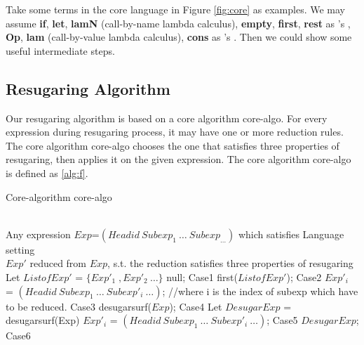 Take some terms in the core language in Figure \ref{fig:core} as examples.
We may assume {\bfseries if}, {\bfseries let}, {\bfseries lamN} (call-by-name lambda calculus), {\bfseries empty}, {\bfseries first}, {\bfseries rest} as 's , {\bfseries Op}, {\bfseries lam} (call-by-value lambda calculus), {\bfseries cons} as 's . Then we could show some useful intermediate steps.


\subsection{Resugaring Algorithm}

Our resugaring algorithm is based on a core algorithm core-algo. For every expression during resugaring process, it may have one or more reduction rules. The core algorithm core-algo chooses the one that satisfies three properties of resugaring, then applies it on the given expression. The core algorithm core-algo is defined as \ref{alg:f}.
\begin{algorithm}
	\caption{Core-algorithm core-algo}
	\label{alg:f}     %
	\begin{algorithmic}[1]       %
		\REQUIRE ~~\\      %
		Any expression $Exp$=$(Headid~Subexp_{1}~\ldots~Subexp_{\ldots})$ which satisfies Language setting
		\ENSURE ~~\\     %
		$Exp'$ reduced from $Exp$, s.t. the reduction satisfies three properties of resugaring
		\STATE     Let $ListofExp'$ = $\{Exp'_{1}\;,Exp'_{2}~\ldots\}$
		\RETURN null; \hfill Case1
		\RETURN first($ListofExp'$); \hfill Case2
		\ELSE
		\RETURN $Exp'_{i}$ = $(Headid~Subexp_{1}~\ldots~Subexp'_{i}~\ldots)$; //where i is the index of subexp which have to be reduced. \hfill Case3
		\ENDIF
		\ELSE
		\RETURN desugarsurf($Exp$); \hfill Case4
		\ELSE
		\STATE Let $DesugarExp$ = desugarsurf(Exp)
		\RETURN $Exp'_{i}$ = $(Headid~Subexp_{1}~\ldots~Subexp'_{i}~\ldots)$; \hfill Case5
		\ELSE
		\RETURN $DesugarExp$; \hfill Case6
		\ENDIF
		\ENDIF
		\ENDIF

	\end{algorithmic}
\end{algorithm}


